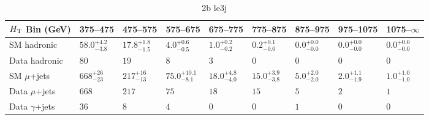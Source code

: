 \documentclass[8pt]{article}
\def\scalht{\mbox{$H_{\rm{T}}$}\xspace}
\newcommand\T{\rule{0pt}{2.6ex}}
\newcommand\B{\rule[-1.2ex]{0pt}{0pt}}
\begin{document}
\begin{table}[ht!]
\caption{2b le3j}
\label{tab:ensemble-2b le3j}
\centering
\begin{tabular}{ lllllllll }

\hline
\scalht Bin (GeV)       & 375--475                       & 475--575                       & 575--675                       & 675--775                       & 775--875                       & 875--975                       & 975--1075                      & 1075--$\infty$                 \\ [1.000000ex]
\hline
SM hadronic\T           & $58.0^{+4.2}_{-3.8}$           & $17.8^{+1.8}_{-1.5}$           & $4.0^{+0.6}_{-0.5}$            & $1.0^{+0.2}_{-0.2}$            & $0.2^{+0.1}_{-0.0}$            & $0.0^{+0.0}_{-0.0}$            & $0.0^{+0.0}_{-0.0}$            & $0.0^{+0.0}_{-0.0}$            \\ 
Data hadronic\B         & $80$                           & $19$                           & $8$                            & $3$                            & $0$                            & $0$                            & $0$                            & $0$                            \\ 
\hline
SM $\mu$+jets\T         & $668^{+26}_{-23}$              & $217^{+16}_{-13}$              & $75.0^{+10.1}_{-8.1}$          & $18.0^{+4.8}_{-4.0}$           & $15.0^{+3.9}_{-3.8}$           & $5.0^{+2.0}_{-2.0}$            & $2.0^{+1.1}_{-1.9}$            & $1.0^{+1.0}_{-1.0}$            \\ 
Data $\mu$+jets\B       & $668$                          & $217$                          & $75$                           & $18$                           & $15$                           & $5$                            & $2$                            & $1$                            \\ 
\hline
Data $\gamma$+jets\B    & $36$                           & $8$                            & $4$                            & $0$                            & $0$                            & $1$                            & $0$                            & $0$                            \\ 
\hline

\end{tabular}
\end{table}
\end{document}
